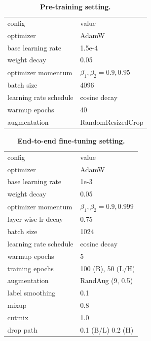 \documentclass[10pt,twocolumn,letterpaper]{article}
\newcommand{\tablestyle}[2]{\setlength{\tabcolsep}{#1}\renewcommand{\arraystretch}{#2}\centering\footnotesize}
\begin{document}
\begin{table}[t]
\tablestyle{6pt}{1.02}
\scriptsize
\begin{tabular}{y{96}|y{68}}
config & value \\
\shline
optimizer & AdamW \cite{Loshchilov2019} \\
base learning rate & 1.5e-4 \\
weight decay & 0.05 \\
optimizer momentum & $\beta_1, \beta_2{=}0.9, 0.95$ \cite{Chen2020c} \\
batch size & 4096 \\
learning rate schedule & cosine decay \cite{Loshchilov2016} \\
warmup epochs \cite{Goyal2017} & 40 \\
augmentation & RandomResizedCrop \\
\end{tabular}
\vspace{-.5em}
\caption{\textbf{Pre-training setting.}}
\label{tab:impl_mae_pretrain} \vspace{-.5em}
\end{table}

\begin{table}[t]
\tablestyle{6pt}{1.02}
\scriptsize
\begin{tabular}{y{96}|y{68}}
config & value \\
\shline
optimizer & AdamW \\
base learning rate & 1e-3 \\
weight decay & 0.05 \\
optimizer momentum & $\beta_1, \beta_2{=}0.9, 0.999$ \\
layer-wise lr decay \cite{Clark2020,Bao2021} & 0.75 \\
batch size & 1024 \\
learning rate schedule & cosine decay \\
warmup epochs & 5 \\
training epochs & 100 (B), 50 (L/H) \\
augmentation & RandAug (9, 0.5) \cite{Cubuk2020} \\
label smoothing \cite{Szegedy2016a} & 0.1 \\
mixup \cite{Zhang2018a} & 0.8 \\
cutmix \cite{Yun2019} & 1.0 \\
drop path \cite{Huang2016} & 0.1 (B/L) 0.2 (H) \\
\end{tabular}
\vspace{-.5em}
\caption{\textbf{End-to-end fine-tuning setting.}}
\label{tab:impl_mae_finetune} \vspace{-.5em}
\end{table}
\end{document}
